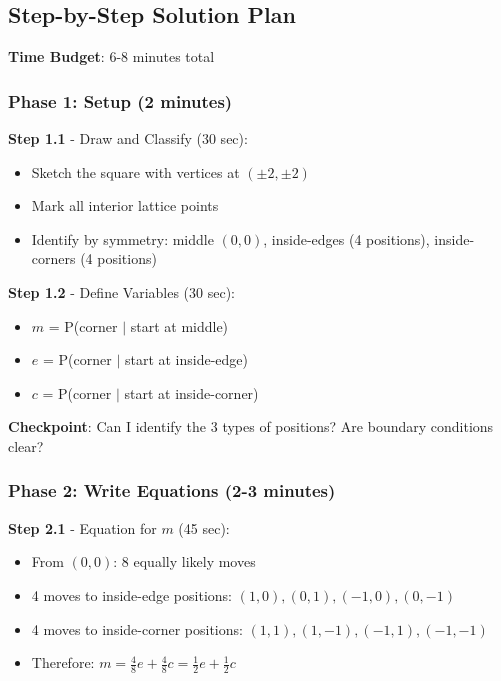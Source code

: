 \documentclass[12pt]{article}
\begin{document}
\begin{roadmapbox}

\subsection*{Step-by-Step Solution Plan}

\textbf{Time Budget}: 6-8 minutes total

\subsubsection*{Phase 1: Setup (2 minutes)}

\textbf{Step 1.1} - Draw and Classify (30 sec):
\begin{itemize}[leftmargin=*]
    \item Sketch the square with vertices at $(\pm 2, \pm 2)$
    \item Mark all interior lattice points
    \item Identify by symmetry: middle $(0,0)$, inside-edges (4 positions), inside-corners (4 positions)
\end{itemize}

\textbf{Step 1.2} - Define Variables (30 sec):
\begin{itemize}[leftmargin=*]
    \item $m$ = P(corner $|$ start at middle)
    \item $e$ = P(corner $|$ start at inside-edge)
    \item $c$ = P(corner $|$ start at inside-corner)
\end{itemize}

\textbf{Checkpoint}: Can I identify the 3 types of positions? Are boundary conditions clear?

\subsubsection*{Phase 2: Write Equations (2-3 minutes)}

\textbf{Step 2.1} - Equation for $m$ (45 sec):
\begin{itemize}[leftmargin=*]
    \item From $(0,0)$: 8 equally likely moves
    \item 4 moves to inside-edge positions: $(1,0), (0,1), (-1,0), (0,-1)$
    \item 4 moves to inside-corner positions: $(1,1), (1,-1), (-1,1), (-1,-1)$
    \item Therefore: $m = \frac{4}{8}e + \frac{4}{8}c = \frac{1}{2}e + \frac{1}{2}c$
\end{itemize}


\end{roadmapbox}
\end{document}
